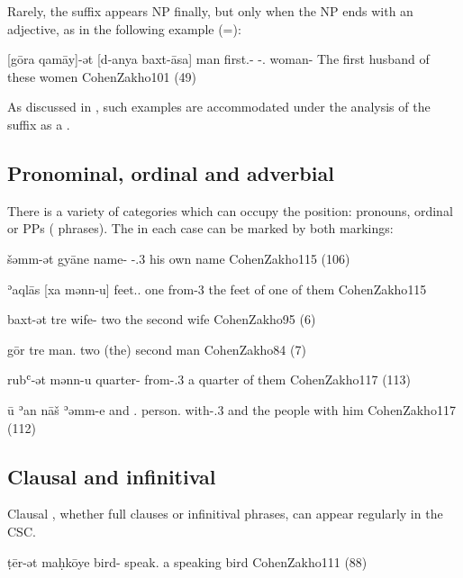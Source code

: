 Rarely, the \cst* suffix appears NP finally, but only when the NP ends with an adjective, as in the following example (=):

{[gōra qamāy]-ət [d-anya baxt-āsa]}
{man first.\masc-\cst{} \gen-\dem.\pl{} woman-\pl}
{The first husband of these women}
{CohenZakho}{101 (49)}



As discussed in , such examples are accommodated under the analysis of the \ed suffix as a . 




\subsection{Pronominal, ordinal and adverbial \secns}
\label{ss:JZax_adv_secn}

There is a variety of categories which can occupy the \secn position: pronouns, ordinal or PPs ( phrases). The \prim in each case can be marked by both \cst* markings:

{šəmm-ət gyāne}
{name-\cst{} -\poss.3\masc}
{his own name}
	{CohenZakho}{115 (106)}
	
{ʾaqlās [xa mənn-u]}
{feet.\pl.\cst{} one from-3\pl}
{the feet of one of them}
{CohenZakho}{115}

{baxt-ət tre}
{wife-\cst{} two}
{the second wife}
{CohenZakho}{95 (6)}

{gōr tre}
	{man.\cst{} two}
{(the) second man}
{CohenZakho}{84 (7)}

{rubʿ-ət mənn-u}
{quarter-\cst{} from-\poss.3\pl}
{a quarter of them}
{CohenZakho}{117 (113)}

{ū\cb{} ʾan nāš ʾəmm-e}
{and\cb{} .\pl{} person.\cst{} with-\poss.3\masc}
{and the people with him}
{CohenZakho}{117 (112)}\antipar\newpage



\subsection{Clausal and infinitival \secns} \label{ss:JZax_clausal}
\largerpage
Clausal \secns, whether full clauses or infinitival phrases, can appear regularly in the CSC. 
	
{ṭēr-ət maḥkōye}
{bird-\cst{} speak.\inf}
{a speaking bird}
{CohenZakho}{111 (88)}

